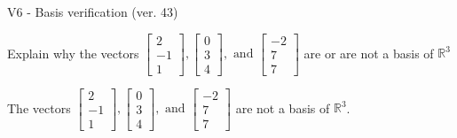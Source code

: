\begin{exercise}
  \begin{exerciseTitle}V6 - Basis verification (ver. 43)\end{exerciseTitle}
  \begin{exerciseStatement}
    Explain why the vectors \(\left[\begin{array}{r}
2 \\
-1 \\
1
\end{array}\right] , \left[\begin{array}{r}
0 \\
3 \\
4
\end{array}\right] , \text{ and } \left[\begin{array}{r}
-2 \\
7 \\
7
\end{array}\right]\) are or are not a basis of \(\mathbb{R}^3\)	


  \end{exerciseStatement}
  \begin{exerciseAnswer}
   The vectors \(\left[\begin{array}{r}
2 \\
-1 \\
1
\end{array}\right] , \left[\begin{array}{r}
0 \\
3 \\
4
\end{array}\right] , \text{ and } \left[\begin{array}{r}
-2 \\
7 \\
7
\end{array}\right]\) 
  	 are not  a basis of \(\mathbb{R}^3\).
  


  \end{exerciseAnswer}
\end{exercise}